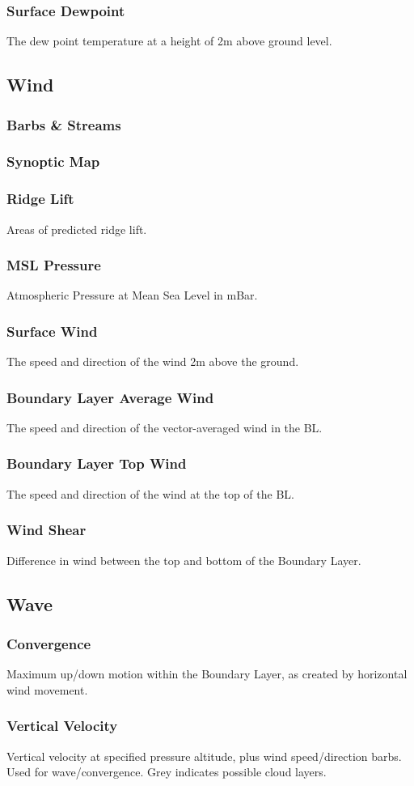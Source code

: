 \documentclass[11pt,a4paper]{article}
\begin{document}
\subsubsection{Surface Dewpoint}
The dew point temperature at a height of 2m above ground level.
\subsection{Wind}
\subsubsection{Barbs \& Streams}
\subsubsection{Synoptic Map}
\subsubsection{Ridge Lift}
Areas of predicted ridge lift.
\subsubsection{MSL Pressure}
Atmospheric Pressure at Mean Sea Level in mBar.
\subsubsection{Surface Wind}
The speed and direction of the wind 2m above the ground.
\subsubsection{Boundary Layer Average Wind}
The speed and direction of the vector-averaged wind in the BL.
\subsubsection{Boundary Layer Top Wind}
The speed and direction of the wind at the top of the BL.
\subsubsection{Wind Shear}
Difference in wind between the top and bottom of the Boundary Layer.
\subsection{Wave}
\subsubsection{Convergence}
Maximum up/down motion within the Boundary Layer, as created by horizontal wind movement.
\subsubsection{Vertical Velocity}
Vertical velocity at specified pressure altitude, plus wind speed/direction barbs. Used for wave/convergence. Grey indicates possible cloud layers.
\end{document}
